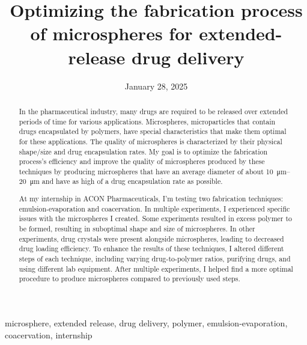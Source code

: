 ﻿\documentclass[12pt,conference,onecolumn]{IEEEtran}
\title{Optimizing the fabrication process of microspheres for extended-release drug delivery}
\author{%
\IEEEauthorblockN{Jake Schatz}\IEEEauthorblockA{Science \& Engineering\\Manalapan High School\\Englishtown, NJ\\425jschatz@frhsd.com}}
\date{January 28, 2025}
\newcommand{\keywords}{microsphere, extended release, drug delivery, polymer, emulsion-evaporation, coacervation, internship}
\begin{document}
\maketitle 

\begin{abstract}
In the pharmaceutical industry, many drugs are required to be released over extended periods of time for various applications. Microspheres, microparticles that contain drugs encapsulated by polymers, have special characteristics that make them optimal for these applications. The quality of microspheres is characterized by their physical shape/size and drug encapsulation rates. My goal is to optimize the fabrication process's efficiency and improve the quality of microspheres produced by these techniques by producing microspheres that have an average diameter of about \qtyrange{10}{20}{\micro\meter} and have as high of a drug encapsulation rate as possible.

At my internship in ACON Pharmaceuticals, I’m testing two fabrication techniques: emulsion-evaporation and coacervation. In multiple experiments, I experienced specific issues with the microspheres I created. Some experiments resulted in excess polymer to be formed, resulting in suboptimal shape and size of microspheres. In other experiments, drug crystals were present alongside microspheres, leading to decreased drug loading efficiency. To enhance the results of these techniques, I altered different steps of each technique, including varying drug-to-polymer ratios, purifying drugs, and using different lab equipment. After multiple experiments, I helped find a more optimal procedure to produce microspheres compared to previously used steps.
\end{abstract}

\begin{IEEEkeywords}
\keywords
\end{IEEEkeywords}
\end{document}
